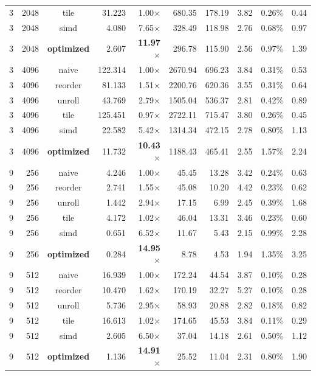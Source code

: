 \documentclass[11pt,a4paper]{article}
\begin{document}
{\begin{longtable}{rrcrrrrrrr}
3 & 2048 & tile & 31.223 & 1.00$\times$ & 680.35 & 178.19 & 3.82 & 0.26\% & 0.44 \\
3 & 2048 & simd & 4.080 & 7.65$\times$ & 328.49 & 118.98 & 2.76 & 0.68\% & 0.97 \\
3 & 2048 & \textbf{optimized} & 2.607 & \textbf{11.97$\times$} & 296.78 & 115.90 & 2.56 & 0.97\% & 1.39 \\
\midrule
3 & 4096 & naive & 122.314 & 1.00$\times$ & 2670.94 & 696.23 & 3.84 & 0.31\% & 0.53 \\
3 & 4096 & reorder & 81.133 & 1.51$\times$ & 2200.76 & 620.36 & 3.55 & 0.31\% & 0.64 \\
3 & 4096 & unroll & 43.769 & 2.79$\times$ & 1505.04 & 536.37 & 2.81 & 0.42\% & 0.89 \\
3 & 4096 & tile & 125.451 & 0.97$\times$ & 2722.11 & 715.47 & 3.80 & 0.26\% & 0.45 \\
3 & 4096 & simd & 22.582 & 5.42$\times$ & 1314.34 & 472.15 & 2.78 & 0.80\% & 1.13 \\
3 & 4096 & \textbf{optimized} & 11.732 & \textbf{10.43$\times$} & 1188.43 & 465.41 & 2.55 & 1.57\% & 2.24 \\
\midrule
9 & 256 & naive & 4.246 & 1.00$\times$ & 45.45 & 13.28 & 3.42 & 0.24\% & 0.63 \\
9 & 256 & reorder & 2.741 & 1.55$\times$ & 45.08 & 10.20 & 4.42 & 0.23\% & 0.62 \\
9 & 256 & unroll & 1.442 & 2.94$\times$ & 17.15 & 6.99 & 2.45 & 0.39\% & 1.68 \\
9 & 256 & tile & 4.172 & 1.02$\times$ & 46.04 & 13.31 & 3.46 & 0.23\% & 0.60 \\
9 & 256 & simd & 0.651 & 6.52$\times$ & 11.67 & 5.43 & 2.15 & 0.99\% & 2.28 \\
9 & 256 & \textbf{optimized} & 0.284 & \textbf{14.95$\times$} & 8.78 & 4.53 & 1.94 & 1.35\% & 3.25 \\
\midrule
9 & 512 & naive & 16.939 & 1.00$\times$ & 172.24 & 44.54 & 3.87 & 0.10\% & 0.28 \\
9 & 512 & reorder & 10.470 & 1.62$\times$ & 170.19 & 32.27 & 5.27 & 0.10\% & 0.28 \\
9 & 512 & unroll & 5.736 & 2.95$\times$ & 58.93 & 20.88 & 2.82 & 0.18\% & 0.82 \\
9 & 512 & tile & 16.613 & 1.02$\times$ & 174.65 & 45.53 & 3.84 & 0.11\% & 0.29 \\
9 & 512 & simd & 2.605 & 6.50$\times$ & 37.04 & 14.18 & 2.61 & 0.50\% & 1.12 \\
9 & 512 & \textbf{optimized} & 1.136 & \textbf{14.91$\times$} & 25.52 & 11.04 & 2.31 & 0.80\% & 1.90 \\

\end{longtable}}
\end{document}
